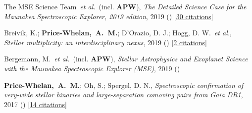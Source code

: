 \item[{\color{deemph}\scriptsize4}]The MSE Science Team~\textit{et al.}~(incl. \textbf{APW}), \textit{The Detailed Science Case for the Maunakea Spectroscopic Explorer, 2019 edition}, 2019 () [\href{http://adsabs.harvard.edu/abs/2019arXiv190404907T}{30 citations}]

\item[{\color{deemph}\scriptsize3}]Breivik, K.; \textbf{Price-Whelan,~A.~M.}; D'Orazio, D. J.; Hogg, D. W.~\textit{et al.}, \textit{Stellar multiplicity: an interdisciplinary nexus}, 2019 () [\href{http://adsabs.harvard.edu/abs/2019arXiv190305094B}{2 citations}]

\item[{\color{deemph}\scriptsize2}]Bergemann, M.~\textit{et al.}~(incl. \textbf{APW}), \textit{Stellar Astrophysics and Exoplanet Science with the Maunakea Spectroscopic Explorer (MSE)}, 2019 ()

\item[{\color{deemph}\scriptsize1}]\textbf{Price-Whelan,~A.~M.}; Oh, S.; Spergel, D. N., \textit{Spectroscopic confirmation of very-wide stellar binaries and large-separation comoving pairs from Gaia DR1}, 2017 () [\href{http://adsabs.harvard.edu/abs/2017arXiv170903532P}{14 citations}]
